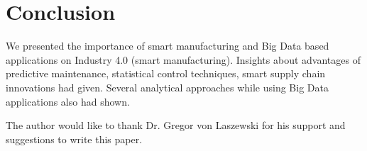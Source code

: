 \documentclass[sigconf]{acmart}
\begin{document}

\section{Conclusion}

We presented the importance of smart manufacturing and Big Data based applications on Industry 4.0 (smart manufacturing). Insights about advantages of predictive maintenance, statistical control techniques, smart supply chain innovations had given. Several analytical approaches while using Big Data applications also had shown.

\begin{acks}

The author would like to thank Dr. Gregor von Laszewski for his support and suggestions to write this paper.

\end{acks}


 
\end{document}
